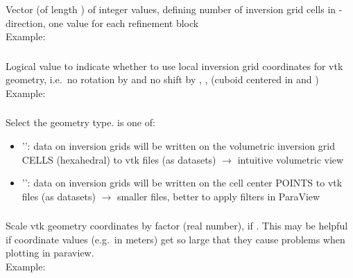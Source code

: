 \subsubsection{}
Vector (of length ) of integer values, defining number of 
inversion grid cells in -direction, one value for each refinement block\\
Example:\\
\subsubsection{}
Logical value to indicate whether to use local inversion grid coordinates for vtk geometry, i.e.\ no rotation 
by  and no shift by , , 
 (cuboid centered in  and )\\
Example:\\
\subsubsection{}
Select the geometry type.  is one of:
\begin{itemize}
\item[]'': data on inversion grids will be written on the volumetric inversion grid CELLS (hexahedral) to vtk files (as  datasets) $\rightarrow$ intuitive volumetric view
\item[]'': data on inversion grids will be written on the cell center POINTS to vtk files (as  datasets) $\rightarrow$ smaller files, better to apply filters in ParaView
\end{itemize}
\subsubsection{}
Scale vtk geometry coordinates by factor  (real number), if 
. This may be helpful if coordinate values (e.g.\ in meters) 
get so large that they cause problems when plotting in paraview.\\
Example:\\
\\
%

